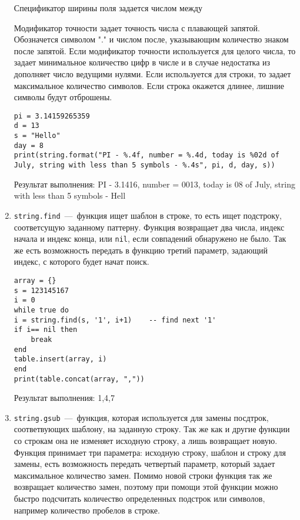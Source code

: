 \begin{enumerate}
Спецификатор ширины поля задается числом между %

Модификатор точности задает точность числа с плавающей запятой. Обозначется символом "." и числом после, указывающим количество знаком после запятой. Если модификатор точности используется для целого числа, то задает минимальное количество цифр в числе и в случае недостатка из дополняет число ведущими нулями. Если используется для строки, то задает максимальное количество символов. Если строка окажется длинее, лишние символы будут отброшены. 

\begin{lstlisting}
pi = 3.14159265359
d = 13
s = "Hello"
day = 8
print(string.format("PI - %.4f, number = %.4d, today is %02d of July, string with less than 5 symbols - %.4s", pi, d, day, s))
\end{lstlisting} 

Результат выполнения:
PI - 3.1416, number = 0013, today is 08 of July, string with less than 5 symbols - Hell

	\item \lstinline{string.find}~---~функция ищет шаблон в строке, то есть ищет подстроку, соответсущую заданному паттерну. Функция возвращает два числа, индекс начала и индекс конца, или \lstinline{nil}, если совпадений обнаружено не было. Так же есть возможность передать в функцию третий параметр, задающий индекс, с которого будет начат поиск. 
	
\begin{lstlisting}
array = {}
s = 123145167
i = 0
while true do
i = string.find(s, '1', i+1)	-- find next '1'
if i== nil then
	break
end
table.insert(array, i)
end
print(table.concat(array, ","))
\end{lstlisting}

Результат выполнения:
1,4,7

	\item \lstinline{string.gsub}~---~функция, которая используется для замены посдтрок, соответвующих шаблону, на заданную строку. Так же как и другие функции со строкам она не изменяет исходную строку, а лишь возвращает новую. Функция принимает три параметра: исходную строку, шаблон и строку для замены, есть возможность передать четвертый параметр, который задает максимальное количество замен. Помимо новой строки функция так же возвращает количество замен, поэтому при помощи этой функции можно быстро подсчитать количество определенных подстрок или символов, например количество пробелов в строке. 
	

\end{enumerate}
